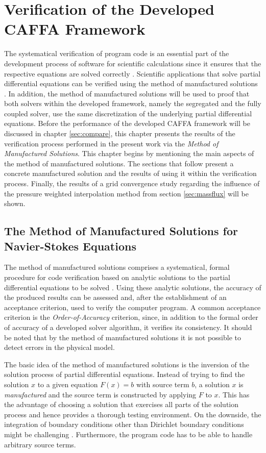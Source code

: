 \chapter{Verification of the Developed CAFFA Framework}
\label{sec:verification}

The systematical verification of program code is an essential part of the development process of software for scientific calculations since it ensures that the respective equations are solved correctly \cite{oberkampf02}. Scientific applications that solve partial differential equations can be verified using the method of manufactured solutions \cite{salari00}. In addition, the method of manufactured solutions will be used to proof that both solvers within the developed framework, namely the segregated and the fully coupled solver, use the same discretization of the underlying partial differential equations. Before the performance of the developed CAFFA framework will be discussed in chapter \ref{sec:compare}, this chapter presents the results of the verification process performed in the present work via the \emph{Method of Manufactured Solutions}. This chapter begins by mentioning the main aspects of the method of manufactured solutions. The sections that follow present a concrete manufactured solution and the results of using it within the verification process. Finally, the results of a grid convergence study regarding the influence of the pressure weighted interpolation method from section \ref{sec:massflux} will be shown.

\section{The Method of Manufactured Solutions for Navier-Stokes Equations}

The method of manufactured solutions comprises a systematical, formal procedure for code verification based on analytic solutions to the partial differential equations to be solved \cite{salari00}. Using these analytic solutions, the accuracy of the produced results can be assessed and, after the establishment of an acceptance criterion, used to verify the computer program. A common acceptance criterion is the \emph{Order-of-Accuracy} criterion, since, in addition to the formal order of accuracy of a developed solver algorithm, it verifies its consistency. It should be noted that by the method of manufactured solutions it is not possible to detect errors in the physical model.

The basic idea of the method of manufactured solutions is the inversion of the solution process of partial differential equations. Instead of trying to find the solution \(x\) to a given equation \(F(x) = b\) with source term \(b\), a solution \(x\) is \emph{manufactured} and the source term is constructed by applying \(F\) to \(x\). This has the advantage of choosing a solution that exercises all parts of the solution process and hence provides a thorough testing environment. On the downside, the integration of boundary conditions other than Dirichlet boundary conditions might be challenging \cite{salari00}. Furthermore, the program code has to be able to handle arbitrary source terms. 

